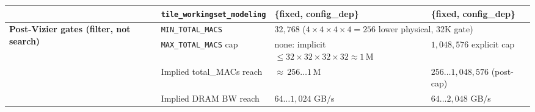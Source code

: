 \begin{table}[h]
{\begin{tabular}{llll}
 & \texttt{tile\_workingset\_modeling} & \{fixed, config\_dep\}                                  & \{fixed, config\_dep\}                                 \\
\midrule
\multirow{4}{*}{\textbf{Post-Vizier gates (filter, not search)}}
 & \texttt{MIN\_TOTAL\_MACS}           & \multicolumn{2}{l}{$32{,}768$ ($4{\times}4{\times}4{\times}4{=}256$ lower physical, 32K gate)} \\
 & \texttt{MAX\_TOTAL\_MACS} cap       & none: implicit $\leq 32{\times}32{\times}32{\times}32 \approx 1\,\text{M}$ & $1{,}048{,}576$ explicit cap \\
 & Implied total\_MACs reach           & ${\approx}\,256 \ldots 1\,\text{M}$                     & $256 \ldots 1{,}048{,}576$ (post-cap)                  \\
 & Implied DRAM BW reach               & $64 \ldots 1{,}024$ GB/s                                & $64 \ldots 2{,}048$ GB/s                               \\
\bottomrule
\end{tabular}%
}
\end{table}
